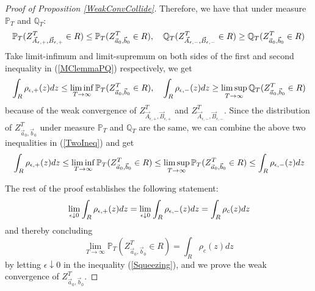 \begin{proof}[Proof of Proposition \ref{WeakConvCollide}]
Therefore, we have that under measure $\mathbb{P}_{T}$ and $\mathbb{Q}_{T}$:
\begin{equation}{\label{MClemmaPQ}}
	\mathbb{P}_{T}(Z^{T}_{\vec{A}_{\epsilon,+},\vec{B}_{\epsilon,+}}\in R)\leq \mathbb{P}_{T}(Z^{T}_{\vec{a}_{0},\vec{b}_{0}}\in R),\quad \mathbb{Q}_{T}(Z^{T}_{\vec{A}_{\epsilon,-},\vec{B}_{\epsilon,-}}\in R)\geq \mathbb{Q}_{T}(Z^{T}_{\vec{a}_{0},\vec{b}_{0}}\in R)
\end{equation}
Take limit-infimum and limit-supremum on both sides of the first and second inequality in (\ref{MClemmaPQ}) respectively, we get
\begin{align}{\label{TwoIneq}}
\int_{R}\rho_{\epsilon,+}(z)dz\leq \liminf_{T\rightarrow\infty}\mathbb{P}_{T}(Z^{T}_{\vec{a}_{0},\vec{b}_{0}}\in R),\quad \int_{R}\rho_{\epsilon,-}(z)dz\geq \limsup_{T\rightarrow\infty}\mathbb{Q}_{T}(Z^{T}_{\vec{a}_{0},\vec{b}_{0}}\in R)
\end{align}
because of the weak convergence of $Z^{T}_{\vec{A}_{\epsilon,+},\vec{B}_{\epsilon,+}}$ and $Z^{T}_{\vec{A}_{\epsilon,-},\vec{B}_{\epsilon,-}}$. Since the distribution of $Z^{T}_{\vec{a}_{0},\vec{b}_{0}}$ under measure $\mathbb{P}_{T}$ and $\mathbb{Q}_{T}$ are the same, we can combine the above two inequalities in (\ref{TwoIneq}) and get
\begin{align}{\label{Squeezing}}
\int_{R}\rho_{\epsilon,+}(z)dz\leq \liminf_{T\rightarrow\infty}\mathbb{P}_{T}(Z^{T}_{\vec{a}_{0},\vec{b}_{0}}\in R)\leq\limsup_{T\rightarrow\infty}\mathbb{P}_{T}(Z^{T}_{\vec{a}_{0},\vec{b}_{0}}\in R)\leq\int_{R}\rho_{\epsilon,-}(z)dz	
\end{align}

The rest of the proof establishes the following statement:
\begin{align}{\label{WeakConvConclude}}
\lim_{\epsilon\downarrow 0}\int_{R}\rho_{\epsilon,+}(z)dz=\lim_{\epsilon\downarrow 0}\int_{R}\rho_{\epsilon,-}(z)dz=\int_{R}\rho_{c}(z)dz
\end{align}
and thereby concluding $$\lim_{T\rightarrow\infty}\mathbb{P}_{T}(Z^{T}_{\vec{a}_{0},\vec{b}_{0}}\in R)=\int_{R}\rho_{c}(z)dz$$ by letting $\epsilon\downarrow 0$ in the inequality (\ref{Squeezing}), and we prove the weak convergence of $Z^{T}_{\vec{a}_{0},\vec{b}_{0}}$.


\end{proof}

